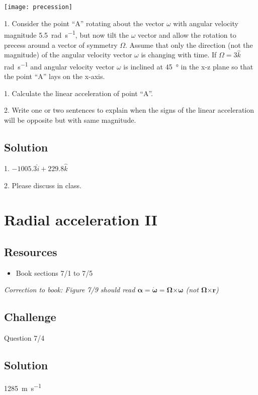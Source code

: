 \texttt{[image: precession]}

1. Consider the point ``A'' rotating about the vector $\omega$ with angular velocity magnitude \SI{5.5}{\radian\per\second}, but now tilt the $\omega$ vector and allow the rotation to precess around a vector of symmetry $\Omega$. Assume that only the direction (not the magnitude) of the angular velocity vector $\omega$ is changing with time. If $\Omega = 3\hat{k}$ \si{\radian\per\second} and angular velocity vector $\omega$ is inclined at \SI{45}{\degree} in the x-z plane so that the point ``A'' lays on the x-axis.

1. Calculate the linear acceleration of point ``A''.

2. Write one or two sentences to explain when the signs of the linear acceleration will be opposite but with same magnitude.


\subsection*{Solution}
1. $-1005.3 \hat{i} + 229.8 \hat{k}$

2. Please discuss in class.




\newpage
\section{Radial acceleration II}

\subsection*{Resources}
\begin{itemize}
    \item Book sections 7/1 to 7/5
\end{itemize}

\emph{Correction to book: Figure 7/9 should read $\bm{\alpha} = \bm{\dot{\omega}} = \bm{\Omega} \bm{\times} \bm{\omega}$ (not $\bm{\Omega} \bm{\times} \bm{r}$)}

\subsection*{Challenge}
Question 7/4

\subsection*{Solution}
\SI{1285}{\meter\per\second}




